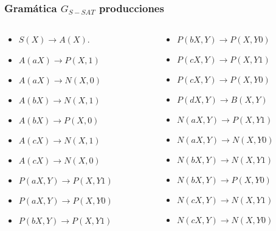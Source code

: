 \documentclass{beamer}
\begin{document}
\begin{frame}
    \frametitle{Gramática $G_{S-SAT}$ producciones}

    \begin{columns}
        \begin{column}{0.48\textwidth}
            \begin{itemize}
                \item $S(X)\to A(X)$.

                \item $A(aX)\to P(X,1)$
                \item $A(aX)\to N(X,0)$
                \item $A(bX)\to N(X,1)$
                \item $A(bX)\to P(X,0)$
                \item $A(cX)\to N(X,1)$
                \item $A(cX)\to N(X,0)$

                \item $P(aX,Y)\to P(X,Y1)$
                \item $P(aX,Y)\to P(X,Y0)$
                \item $P(bX,Y)\to P(X,Y1)$
            \end{itemize}
        \end{column}
        \begin{column}{0.48\textwidth}
            \begin{itemize}
                \item $P(bX,Y)\to P(X,Y0)$

                \item $P(cX,Y)\to P(X,Y1)$
                \item $P(cX,Y)\to P(X,Y0)$
                \item $P(dX,Y)\to B(X,Y)$

                \item $N(aX,Y)\to P(X,Y1)$
                \item $N(aX,Y)\to N(X,Y0)$
                \item $N(bX,Y)\to N(X,Y1)$
                \item $N(bX,Y)\to P(X,Y0)$
                \item $N(cX,Y)\to N(X,Y1)$
                \item $N(cX,Y)\to N(X,Y0)$
            \end{itemize}
        \end{column}

    \end{columns}
\end{frame}
\end{document}
